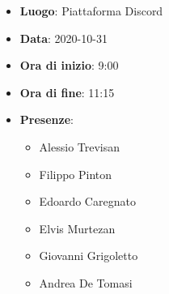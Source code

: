\begin{itemize}
    \item \textbf{Luogo}: Piattaforma Discord
    \item \textbf{Data}: 2020-10-31
    \item \textbf{Ora di inizio}: 9:00
    \item \textbf{Ora di fine}: 11:15
    \item \textbf{Presenze}:
          \begin{itemize}
              \item Alessio Trevisan
              \item Filippo Pinton
              \item Edoardo Caregnato
              \item Elvis Murtezan
              \item Giovanni Grigoletto
              \item Andrea De Tomasi
          \end{itemize}
\end{itemize}